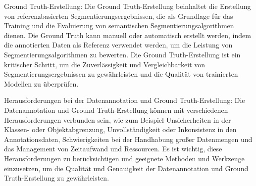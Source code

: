 Ground Truth-Erstellung: Die Ground Truth-Erstellung beinhaltet die Erstellung
von referenzbasierten Segmentierungsergebnissen, die als Grundlage für das
Training und die Evaluierung von semantischen Segmentierungsalgorithmen dienen.
Die Ground Truth kann manuell oder automatisch erstellt werden, indem die
annotierten Daten als Referenz verwendet werden, um die Leistung von
Segmentierungsalgorithmen zu bewerten. Die Ground Truth-Erstellung ist ein
kritischer Schritt, um die Zuverlässigkeit und Vergleichbarkeit von
Segmentierungsergebnissen zu gewährleisten und die Qualität von trainierten
Modellen zu überprüfen.

Herausforderungen bei der Datenannotation und Ground Truth-Erstellung: Die
Datenannotation und Ground Truth-Erstellung können mit verschiedenen
Herausforderungen verbunden sein, wie zum Beispiel Unsicherheiten in der
Klassen- oder Objektabgrenzung, Unvollständigkeit oder Inkonsistenz in den
Annotationsdaten, Schwierigkeiten bei der Handhabung großer Datenmengen und das
Management von Zeitaufwand und Ressourcen. Es ist wichtig, diese
Herausforderungen zu berücksichtigen und geeignete Methoden und Werkzeuge
einzusetzen, um die Qualität und Genauigkeit der Datenannotation und Ground
Truth-Erstellung zu gewährleisten.